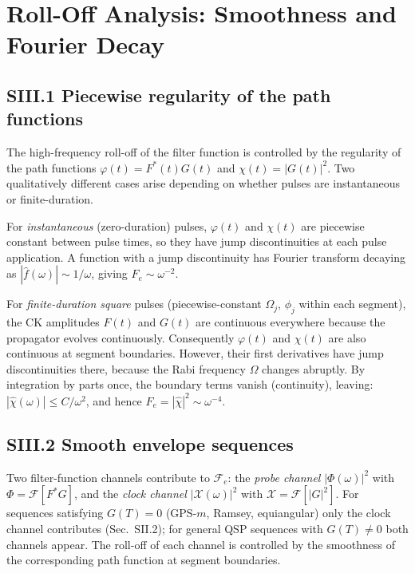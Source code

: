\documentclass[aps,pra,twocolumn,superscriptaddress,longbibliography]{revtex4-2}
\begin{document}
\section{Roll-Off Analysis: Smoothness and Fourier Decay}
\label{supp:rolloff}

\subsection*{SIII.1 Piecewise regularity of the path functions}

The high-frequency roll-off of the filter function is controlled by the regularity
of the path functions $\varphi(t) = F^*(t)G(t)$ and $\chi(t) = |G(t)|^2$.
Two qualitatively different cases arise depending on whether pulses are
instantaneous or finite-duration.

For \emph{instantaneous} (zero-duration) pulses, $\varphi(t)$ and $\chi(t)$ are
piecewise constant between pulse times, so they have jump discontinuities at
each pulse application.
A function with a jump discontinuity has Fourier transform decaying as
$|\hat f(\omega)| \sim 1/\omega$, giving $F_e \sim \omega^{-2}$.

For \emph{finite-duration square} pulses (piecewise-constant $\Omega_j$, $\phi_j$
within each segment), the CK amplitudes $F(t)$ and $G(t)$ are continuous everywhere
because the propagator evolves continuously.
Consequently $\varphi(t)$ and $\chi(t)$ are also continuous at segment boundaries.
However, their first derivatives have jump discontinuities there, because the
Rabi frequency $\Omega$ changes abruptly.
By integration by parts once, the boundary terms vanish (continuity), leaving:
$|\hat\chi(\omega)| \leq C/\omega^2$, and hence $F_e = |\hat\chi|^2 \sim \omega^{-4}$.

\subsection*{SIII.2 Smooth envelope sequences}

Two filter-function channels contribute to $\mathcal{F}_e$:
the \emph{probe channel} $|\Phi(\omega)|^2$ with $\Phi=\mathcal{F}[F^*G]$, and
the \emph{clock channel} $|\mathcal{X}(\omega)|^2$ with $\mathcal{X}=\mathcal{F}[|G|^2]$.
For sequences satisfying $G(T)=0$ (GPS-$m$, Ramsey, equiangular) only the clock channel
contributes (Sec.~SII.2); for general QSP sequences with $G(T)\neq 0$ both channels appear.
The roll-off of each channel is controlled by the smoothness of the corresponding
path function at segment boundaries.
\end{document}
